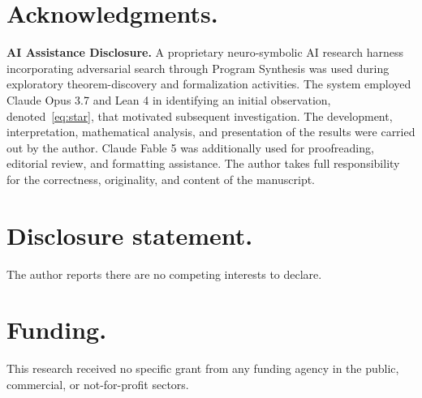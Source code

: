 \documentclass{article}
\theoremstyle{plain}
\theoremstyle{definition}
\begin{document}
\section*{Acknowledgments.}

\textbf{AI Assistance Disclosure.} A proprietary neuro-symbolic AI research
harness incorporating adversarial search through Program Synthesis was used during
exploratory theorem-discovery and formalization activities. The system employed
Claude Opus 3.7 and Lean 4 in identifying an initial observation, denoted~\eqref{eq:star}, that
motivated subsequent investigation. The development, interpretation,
mathematical analysis, and presentation of the results were carried out by the
author. Claude Fable 5 was additionally used for proofreading, editorial
review, and formatting assistance. The author takes full responsibility for the
correctness, originality, and content of the manuscript.

\section*{Disclosure statement.}

The author reports there are no competing interests to declare.

\section*{Funding.}

This research received no specific grant from any funding agency in the
public, commercial, or not-for-profit sectors.



\end{document}
